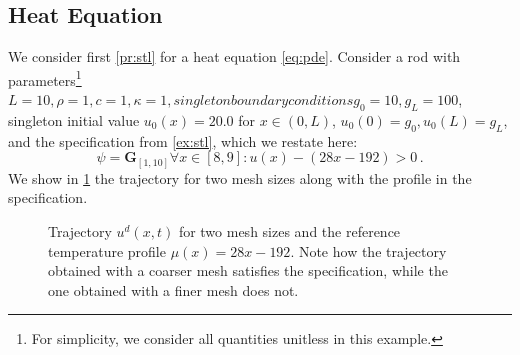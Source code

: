 \documentclass[letterpaper, 10 pt, conference]{ieeeconf/ieeeconf}
\newcommand{\Always}{\mathbf{G}}
\begin{document}
\subsection{Heat Equation}
\label{sub:heat_equation}

We consider first \cref{pr:stl} for a heat equation \cref{eq:pde}.
Consider a rod with parameters\footnote{For simplicity, we consider all
quantities unitless in this example.} $L = 10, \rho = 1, c =
1, \kappa = 1, singleton boundary conditions g_0 = 10, g_L = 100$, singleton initial value $u_0(x) = 20.0$
for $x \in (0, L)$, $u_0(0) = g_0, u_0(L) = g_L$, and the specification from
\cref{ex:stl}, which we restate here:
%
\begin{equation}
    \psi = \Always_{[1,10]} \forall x \in [8,9] : u(x) - (28x - 192) > 0 \,.
\end{equation}
%
We show in \cref{fig:ex1_evolution} the trajectory for two mesh sizes along with the
profile in the specification.

\begin{figure}[!t]
    \centering 
        \hfill
        \hfill
    \caption{Trajectory $u^d(x, t)$ for two mesh sizes and the reference
        temperature profile $\mu(x) = 28x - 192$. Note how the trajectory
        obtained with a coarser mesh satisfies the specification, while the one
        obtained with a finer mesh does not.}
    \label{fig:ex1_evolution}
\end{figure}
\end{document}
